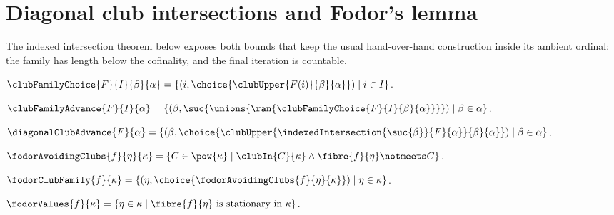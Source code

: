 \section{Diagonal club intersections and Fodor's lemma}




The indexed intersection theorem below exposes both bounds that keep the
usual hand-over-hand construction inside its ambient ordinal: the family has
length below the cofinality, and the final iteration is countable.

\begin{definition}\label{club_family_choice}
    $\clubFamilyChoice{F}{I}{\beta}{\alpha}
        =\{(i,\choice{\clubUpper{F(i)}{\beta}{\alpha}})\mid i\in I\}$.
\end{definition}

\begin{definition}\label{club_family_advance}
    $\clubFamilyAdvance{F}{I}{\alpha}
        =\{(\beta,\suc{\unions{\ran{
            \clubFamilyChoice{F}{I}{\beta}{\alpha}}}})
            \mid \beta\in\alpha\}$.
\end{definition}

\begin{definition}\label{diagonal_club_advance}
    $\diagonalClubAdvance{F}{\alpha}
        =\{(\beta,
            \choice{\clubUpper{
                \indexedIntersection{\suc{\beta}}{F}{\alpha}}
                {\beta}{\alpha}})
            \mid \beta\in\alpha\}$.
\end{definition}

\begin{definition}\label{fodor_avoiding_clubs}
    $\fodorAvoidingClubs{f}{\eta}{\kappa}
        =\{C\in\pow{\kappa}\mid
            \clubIn{C}{\kappa}\land
            \fibre{f}{\eta}\notmeets C\}$.
\end{definition}

\begin{definition}\label{fodor_club_family}
    $\fodorClubFamily{f}{\kappa}
        =\{(\eta,\choice{\fodorAvoidingClubs{f}{\eta}{\kappa}})
            \mid \eta\in\kappa\}$.
\end{definition}

\begin{definition}\label{fodor_values}
    $\fodorValues{f}{\kappa}
        =\{\eta\in\kappa\mid
            \text{$\fibre{f}{\eta}$ is stationary in $\kappa$}\}$.
\end{definition}

